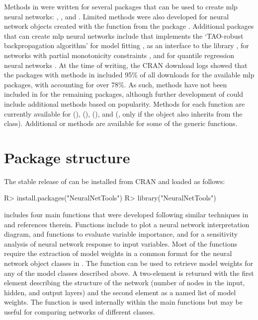 \documentclass[article,shortnames]{jss}
\begin{document}
Methods in  were written for several  packages that can be used to create \ac{mlp} neural networks:  \citep{Fritsch12},  \citep{Venables02}, and  \citep{Bergmeir12}. Limited methods were also developed for neural network objects created with the  function from the  package \citep{Kuhn15}.  Additional  packages that can create \ac{mlp} neural networks include  that implements the `TAO-robust backpropagation algorithm' for model fitting \citep{Castejon14},  as an  interface to the   library \citep{Klima15},  for networks with partial monotonicity constraints \citep{Cannon15}, and  for quantile regression neural networks \citep{Cannon11}.  At the time of writing, the \ac{CRAN} download logs \citep{Csardi15} showed that the  packages with methods in  included 95\% of all downloads for the available \ac{mlp} packages, with  accounting for over 78\%.  As such, methods have not been included in  for the remaining packages, although further development of  could include additional methods based on popularity.  Methods for each function are currently available for   (),  (),  (), and  (, only if the object also inherits from the  class).  Additional  or  methods are available for some of the generic functions.

\section[Package structure]{Package structure}

The stable release of  can be installed from \ac{CRAN} and loaded as follows:

\begin{Schunk}
\begin{Sinput}
R> install.packages("NeuralNetTools")
R> library("NeuralNetTools")
\end{Sinput}
\end{Schunk}

 includes four main functions that were developed following similar techniques in \citet{Olden02} and references therein.  Functions include  to plot a neural network interpretation diagram,  and  functions to evaluate variable importance, and  for a sensitivity analysis of neural network response to input variables.  Most of the functions require the extraction of model weights in a common format for the neural network object classes in .  The  function can be used to retrieve model weights for any of the model classes described above.  A two-element  is returned with the first element describing the structure of the network (number of nodes in the input, hidden, and output layers) and the second element as a named list of model weights.  The function is used internally within the main functions but may be useful for comparing networks of different classes.
\end{document}

